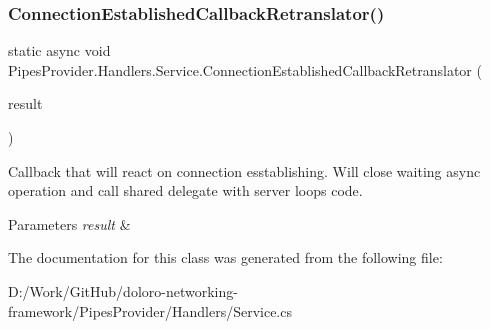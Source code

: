 \subsubsection{\texorpdfstring{Connection\+Established\+Callback\+Retranslator()}{ConnectionEstablishedCallbackRetranslator()}}
{\footnotesize\ttfamily static async void Pipes\+Provider.\+Handlers.\+Service.\+Connection\+Established\+Callback\+Retranslator (\begin{DoxyParamCaption}\item[{I\+Async\+Result}]{result }\end{DoxyParamCaption})\hspace{0.3cm}{\ttfamily [static]}}



Callback that will react on connection esstablishing. Will close waiting async operation and call shared delegate with server loop\textquotesingle{}s code. 


\begin{DoxyParams}{Parameters}
{\em result} & \\
\hline
\end{DoxyParams}


The documentation for this class was generated from the following file\+:\begin{DoxyCompactItemize}
\item 
D\+:/\+Work/\+Git\+Hub/doloro-\/networking-\/framework/\+Pipes\+Provider/\+Handlers/Service.\+cs\end{DoxyCompactItemize}

